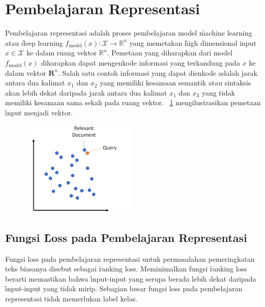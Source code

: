 \section{Pembelajaran Representasi}
Pembelajaran representasi adalah proses pembelajaran model \f{machine learning} atau \f{deep learning} $f_{\text{model}}(x): \mathcal{X} \rightarrow \mathbb{R}^n$ yang memetakan \f{high dimensional input} $x \in \mathcal{X}$ ke dalam ruang vektor $\mathbb{R}^n$. Pemetaan yang diharapkan dari model $f_{\text{model}}(x)$ diharapkan dapat mengenkode informasi yang terkandung pada $x$ ke dalam vektor $\mathbf{R}^n$. Salah satu contoh informasi yang dapat dienkode adalah jarak antara dua kalimat $x_1$ dan $x_2$ yang memiliki kesamaan semantik atau sintaksis akan lebih dekat daripada jarak antara dua kalimat $x_1$ dan $x_3$ yang tidak memiliki kesamaan sama sekali pada ruang vektor. \pic~\ref{fig:reps-learning} mengilustrasikan pemetaan \f{input} menjadi vektor.
\begin{figure}[!ht]
    \centering
    \includegraphics[width=0.5\textwidth]{assets/pics/reps-learning.png}
    \label{fig:reps-learning}
\end{figure}

\subsection{Fungsi \f{Loss} pada Pembelajaran Representasi}


Fungsi loss pada pembelajaran representasi untuk permasalahan pemeringkatan teks biasanya disebut sebagai \f{ranking loss}. Meminimalkan fungsi \f{ranking loss} berarti memastikan bahwa \f{input-input} yang serupa berada lebih dekat daripada \f{input-input} yang tidak mirip. Sebagian besar fungsi loss pada pembelajaran representasi tidak memerlukan label kelas.


